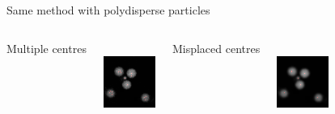 \documentclass{beamer}
\begin{document}
\begin{frame}{Same method with polydisperse particles}
	\begin{columns}[T]
	\centering
	{\strut{}Multiple centres}\\
	\includegraphics[width=\textwidth]{dillute_smaller_blur0_5}
	\centering
	{\strut{}Misplaced centres}\\
	\includegraphics[width=\textwidth]{dillute_smaller_blur1}

\end{columns}
\end{frame}
\end{document}

